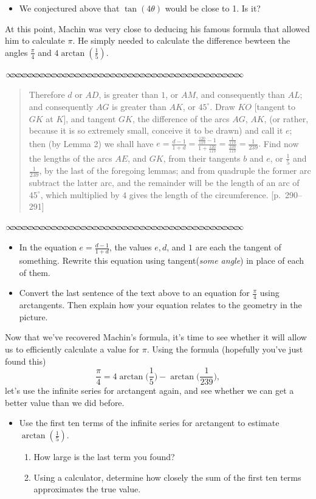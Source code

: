 \documentclass[11pt]{article}
\newcommand{\sep}{\vspace{-3pt}
\begin{center}
{\mathversion{normal}
$\infty \mspace{-5.5mu}\infty \mspace{-5.5mu}\infty \mspace{-5.5mu}\infty \mspace{-5.5mu}
\infty \mspace{-5.5mu}\infty \mspace{-5.5mu}\infty \mspace{-5.5mu}\infty \mspace{-5.5mu}
\infty \mspace{-5.5mu}\infty \mspace{-5.5mu}\infty \mspace{-5.5mu}\infty \mspace{-5.5mu}
\infty \mspace{-5.5mu}\infty \mspace{-5.5mu}\infty \mspace{-5.5mu}\infty \mspace{-5.5mu}
\infty \mspace{-5.5mu}\infty \mspace{-5.5mu}\infty \mspace{-5.5mu}\infty \mspace{-5.5mu}
\infty \mspace{-5.5mu}\infty \mspace{-5.5mu}\infty \mspace{-5.5mu}\infty \mspace{-5.5mu}
\infty \mspace{-5.5mu}\infty \mspace{-5.5mu}\infty \mspace{-5.5mu}\infty \mspace{-5.5mu}
\infty \mspace{-5.5mu}\infty \mspace{-5.5mu}\infty \mspace{-5.5mu}\infty \mspace{-5.5mu}
\infty \mspace{-5.5mu}\infty \mspace{-5.5mu}\infty \mspace{-5.5mu}\infty \mspace{-5.5mu}
\infty \mspace{-5.5mu}\infty \mspace{-5.5mu}\infty \mspace{-5.5mu}\infty \mspace{-5.5mu}$}
\end{center} \vspace*{-5pt}}
\newenvironment{source}%
 {\bigskip \sep \vspace*{-6pt} \begin{quote}
          \begin{sf}   }
   {   \end{sf}     \end{quote} \vspace*{-6pt} \sep \bigskip}%
\newcounter{tasknumb}
\newcommand{\tasknumb}{\stepcounter{tasknumb}\textmd{\textbf{$\fbox{$\fbox{Task \thetasknumb}$}$}}}
\newenvironment{task}%
 {\begin{itemize}
 \item[\tasknumb]  }
{
    \end{itemize}    }%
\begin{document}
\begin{task}
We conjectured above that $\tan (4\theta)$ would be close to 1.  Is it?
\end{task}

At this point, Machin was very close to deducing his famous formula that allowed him to calculate $\pi$.  He simply needed to calculate the difference bewteen the angles $\frac{\pi}{4}$ and $4 \arctan(\frac{1}{5})$.

\begin{source}
Therefore $d$ or $AD$, is greater than $1$, or $AM$, and consequently
than $AL$; and consequently $AG$ is greater than $AK$, or $45^\circ$.
Draw $KO$ [tangent to $GK$ at $K$], and tangent $GK$, the difference of the arcs $AG$, $AK$,
(or rather, because it is so extremely small, conceive it to be drawn) and
call it $e$; then (by Lemma 2) we shall have
$
e = \frac{d-1}{1+d}
=\frac{\frac{120}{119}-1}{1+\frac{120}{119}}
=\frac{\frac{1}{119}}{\frac{239}{119}}
=\frac{1}{239}.
$
Find now the lengths of the arcs $AE$, and $GK$, from their tangents
$b$ and $e$, or $\frac{1}{5}$ and $\frac{1}{239}$, by the last of the foregoing lemmas; and
from quadruple the former arc subtract the latter arc, and the remainder will
be the length of an arc of $45^\circ$, which multiplied by $4$ gives the length of the
circumference. [p.\ 290--291]
\end{source}

\begin{task}
In the equation $e = \frac{d-1}{1+d}$, the values $e, d$, and $1$ are each the tangent of something.  Rewrite this equation using tangent(\emph{some angle}) in place of each of them.
\end{task}

\begin{task}
Convert the last sentence of the text above to an equation for $\frac{\pi}{4}$ using arctangents. Then explain how your equation relates to the geometry in the picture.
\end{task}

Now that we've recovered Machin's formula, it's time to see whether it will allow us to efficiently calculate a value for $\pi$.  Using the formula (hopefully you've just found this)
$$
\frac{\pi}{4} = 4 \arctan\Big(\frac{1}{5}\Big) - \arctan\Big(\frac{1}{239}\Big),
$$
let's use the infinite series for arctangent again, and see whether we can get a better value than we did before.

\begin{task}
Use the first ten terms of the infinite series for arctangent to estimate $\arctan (\frac{1}{5})$.
\begin{enumerate}
\item[a.] How large is the last term you found?
\item[b.] Using a calculator, determine how closely the sum of the first ten terms approximates the true value.
\end{enumerate}
\end{task}
\end{document}
